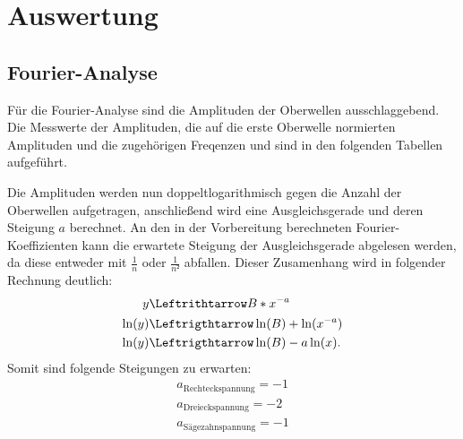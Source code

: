 \section{Auswertung}
\label{sec:Auswertung}
\subsection{Fourier-Analyse}
Für die Fourier-Analyse sind die Amplituden der Oberwellen ausschlaggebend.
Die Messwerte der Amplituden, die auf die erste Oberwelle normierten Amplituden
und die zugehörigen Freqenzen und sind in den folgenden Tabellen aufgeführt.



Die Amplituden werden nun doppeltlogarithmisch gegen die Anzahl der Oberwellen
aufgetragen, anschließend wird eine Ausgleichsgerade und deren Steigung $a$ berechnet.
An den in der Vorbereitung berechneten Fourier-Koeffizienten %
kann die erwartete Steigung der Ausgleichsgerade abgelesen werden, da diese
entweder mit $\frac{1}{n}$ oder $\frac{1}{n²}$ abfallen. Dieser
Zusamenhang wird in folgender Rechnung deutlich:
\begin{align*}
  y &\Leftrithtarrow B*x^{-a}\\
  \ln(y) &\Leftrigthtarrow \ln(B)+\ln(x^{-a})\\
  \ln(y) &\Leftrigthtarrow \ln(B)-a\ln(x).
\end{align*}
Somit sind folgende Steigungen zu erwarten: \\

\begin{align*}
  a_{\text{Rechteckspannung}} = -1 \\
  a_{\text{Dreieckspannung}} = -2  \\
  a_{\text{Sägezahnspannung}} = -1
\end{align*}

